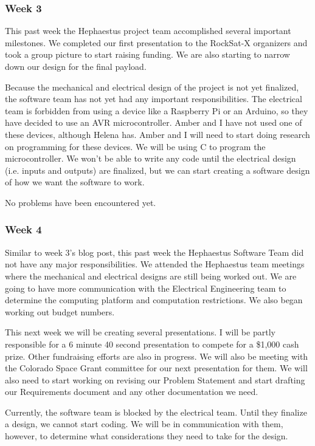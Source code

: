 \subsubsection{Week 3}
This past week the Hephaestus project team accomplished several important milestones. We completed our first presentation to the RockSat-X organizers and took a group picture to start raising funding. We are also starting to narrow down our design for the final \gls{payload}.

Because the mechanical and electrical design of the project is not yet finalized, the software team has not yet had any important responsibilities. The electrical team is forbidden from using a device like a Raspberry Pi or an Arduino, so they have decided to use an AVR microcontroller. Amber and I have not used one of these devices, although Helena has. Amber and I will need to start doing research on programming for these devices. We will be using C to program the microcontroller. We won't be able to write any code until the electrical design (i.e. inputs and outputs) are finalized, but we can start creating a software design of how we want the software to work.

No problems have been encountered yet.

\subsubsection{Week 4}
Similar to week 3's blog post, this past week the Hephaestus Software Team did not have any major responsibilities. We attended the Hephaestus team meetings where the mechanical and electrical designs are still being worked out. We are going to have more communication with the Electrical Engineering team to determine the computing platform and computation restrictions. We also began working out budget numbers.

This next week we will be creating several presentations. I will be partly responsible for a 6 minute 40 second presentation to compete for a \$1,000 cash prize. Other fundraising efforts are also in progress. We will also be meeting with the Colorado Space Grant committee for our next presentation for them. We will also need to start working on revising our Problem Statement and start drafting our Requirements document and any other documentation we need.

Currently, the software team is blocked by the electrical team. Until they finalize a design, we cannot start coding. We will be in communication with them, however, to determine what considerations they need to take for the design.

